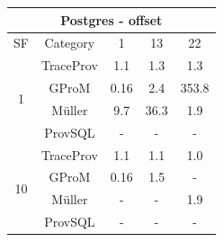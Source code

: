 \begin{tabular}{|c|c|c|c|c|}
\hline
\multicolumn{5}{c}{Postgres - offset} \\
\hline
SF & Category & 1 & 13 & 22 \\  
 \hline 
 \multirow{4}{*}{1} & TraceProv & 1.1 & 1.3 & 1.3 \\  
 \cline{2-5} 
  & GProM & 0.16 & 2.4 & 353.8 \\  
 \cline{2-5} 
  & Müller & 9.7 & 36.3 & 1.9 \\  
 \cline{2-5} 
  & ProvSQL & - & - & - \\  
 \hline 
 \multirow{4}{*}{10} & TraceProv & 1.1 & 1.1 & 1.0 \\  
 \cline{2-5} 
  & GProM & 0.16 & 1.5 & - \\  
 \cline{2-5} 
  & Müller & - & - & 1.9 \\  
 \cline{2-5} 
  & ProvSQL & - & - & - \\ 
\hline
\end{tabular}